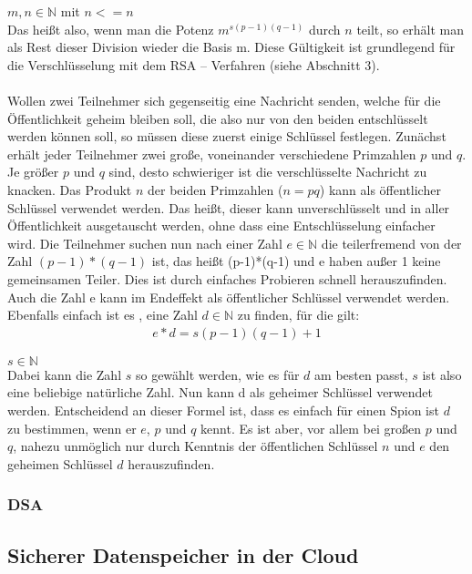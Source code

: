$m,n \in \mathbb N $ mit $n<=n$ \\
Das heißt also, wenn man die Potenz $m^{s(p-1)(q-1)}$
durch $n$ teilt, so erhält man als Rest dieser Division wieder die Basis m. Diese Gültigkeit ist grundlegend für die Verschlüsselung mit dem RSA – Verfahren (siehe Abschnitt 3).
\\\\
Wollen zwei Teilnehmer sich gegenseitig eine Nachricht senden, welche für die
Öffentlichkeit geheim bleiben soll, die also nur von den beiden entschlüsselt werden
können soll, so müssen diese zuerst einige Schlüssel festlegen. Zunächst erhält
jeder Teilnehmer zwei große, voneinander verschiedene Primzahlen $p$ und $q$. Je
größer $p$ und $q$ sind, desto schwieriger ist die verschlüsselte Nachricht zu knacken.
Das Produkt $n$ der beiden Primzahlen ($n = pq$) kann als öffentlicher Schlüssel
verwendet werden. Das heißt, dieser kann unverschlüsselt und in aller Öffentlichkeit
ausgetauscht werden, ohne dass eine Entschlüsselung einfacher wird. 
Die Teilnehmer suchen nun nach einer Zahl $e \in \mathbb{N}$ die teilerfremend von der Zahl
$(p-1)*(q-1)$ ist, das heißt (p-1)*(q-1) und e haben außer 1 keine gemeinsamen Teiler.
Dies ist durch einfaches Probieren schnell herauszufinden. Auch die Zahl e kann im
Endeffekt als öffentlicher Schlüssel verwendet werden. Ebenfalls einfach ist es , eine Zahl $ d \in \mathbb{N}$ zu finden, für die gilt:
\begin{equation}
	\begin{split}
	e*d = s (p-1) (q-1) + 1 
 	\end{split}
\end{equation}

$s \in \mathbb{N}$
\\
Dabei kann die Zahl $s$ so gewählt werden, wie es für $d$ am besten passt, $s$ ist also
eine beliebige natürliche Zahl. Nun kann d als geheimer Schlüssel verwendet
werden. Entscheidend an dieser Formel ist, dass es einfach für einen Spion ist $d$ zu
bestimmen, wenn er $e$, $p$ und $q$ kennt. Es ist aber, vor allem bei großen $p$ und $q$,
nahezu unmöglich nur durch Kenntnis der öffentlichen Schlüssel $n$ und $e$ den
geheimen Schlüssel $d$ herauszufinden.
\subsubsection{DSA}
\subsection*{Sicherer Datenspeicher in der Cloud}

